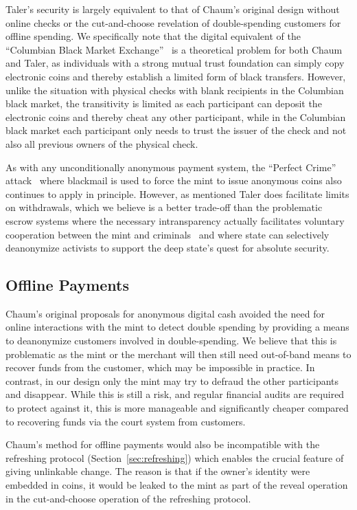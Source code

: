 \documentclass{llncs}
\begin{document}
Taler's security is largely equivalent to that of Chaum's original
design without online checks or the cut-and-choose revelation of
double-spending customers for offline spending. 
We specifically note that the digital equivalent of the ``Columbian 
Black Market Exchange''~\cite{fatf1997} is a theoretical problem for 
both Chaum and Taler, as individuals with a strong mutual trust
foundation can simply copy electronic coins and thereby establish a 
limited form of black transfers.  However, unlike the situation with
physical checks with blank recipients in the Columbian black market,
the transitivity is limited as each participant can deposit the electronic
coins and thereby cheat any other participant, while in the Columbian
black market each participant only needs to trust the issuer of the
check and not also all previous owners of the physical check.

As with any unconditionally anonymous payment system, the ``Perfect
Crime'' attack~\cite{solms1992perfect} where blackmail is used to
force the mint to issue anonymous coins also continues to apply in
principle.  However, as mentioned Taler does facilitate limits on
withdrawals, which we believe is a better trade-off than the
problematic escrow systems where the necessary intransparency
actually facilitates voluntary cooperation between the mint and
criminals~\cite{sander1999escrow} and where state can selectively
deanonymize activists to support the deep state's quest for absolute
security.

\subsection{Offline Payments}

Chaum's original proposals for anonymous digital cash avoided the need
for online interactions with the mint to detect double spending by
providing a means to deanonymize customers involved in
double-spending.  We believe that this is problematic as the mint or
the merchant will then still need out-of-band means to recover funds
from the customer, which may be impossible in practice.  In contrast,
in our design only the mint may try to defraud the other participants
and disappear.  While this is still a risk, and regular financial
audits are required to protect against it, this is more manageable and
significantly cheaper compared to recovering funds via the court
system from customers.

Chaum's method for offline payments would also be incompatible with
the refreshing protocol (Section~\ref{sec:refreshing}) which enables
the crucial feature of giving unlinkable change.  The reason is that
if the owner's identity were embedded in coins, it would be leaked to
the mint as part of the reveal operation in the cut-and-choose
operation of the refreshing protocol.
\end{document}
